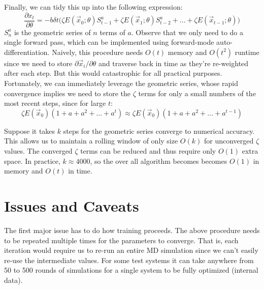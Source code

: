 \documentclass{article}
\begin{document}
Finally, we can tidy this up into the following expression:
\begin{equation}
\dfrac {\partial x_t}{\partial \theta} = -b  \delta t \Big( \zeta E(\vec{x}_0; \theta)S_{t-1}^a + \zeta E(\vec{x}_1;\theta)S_{t-2}^a + \ldots +  \zeta E(\vec{x}_{t-1};\theta) \Big)
\end{equation}
$S_n^a$ is the geometric series of $n$ terms of $a$. Observe that we only need to do a single forward pass, which can be implemented using forward-mode auto-differentiation. Naively, this procedure needs $O(t)$ memory and $O(t^2)$ runtime since we need to store $\partial\vec{x}_i / \partial\theta$ and traverse back in time as they're re-weighted after each step. But this would catastrophic for all practical purposes. Fortunately, we can immediately leverage the geometric series, whose rapid convergence implies we need to store the $\zeta$ terms for only a small numbers of the most recent steps, since for large $t$:
\begin{equation}
\zeta E(\vec{x}_0)(1+a+a^2+...+a^t) \approx \zeta E(\vec{x}_0)(1+a+a^2+...+a^{t-1})
\end{equation}

Suppose it takes $k$ steps for the geometric series converge to numerical accuracy. This allows us to maintain a rolling window of only size $O(k)$ for unconverged $\zeta$ values. The converged $\zeta$ terms can be reduced and thus require only $O(1)$ extra space. In practice, $k \approx 4000$, so the over all algorithm becomes becomes $O(1)$ in memory and $O(t)$ in time. 


\section{Issues and Caveats}

The first major issue has to do how training proceeds. The above procedure needs to be repeated multiple times for the parameters to converge. That is, each iteration would require us to re-run an entire MD simulation since we can't easily re-use the intermediate values. For some test systems it can take anywhere from 50 to 500 rounds of simulations for a single system to be fully optimized (internal data).
\end{document}
